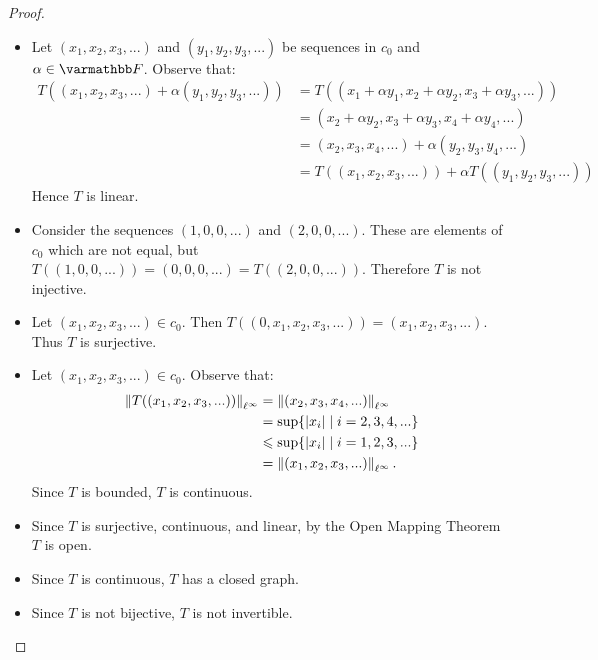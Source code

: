 \documentclass[10pt,oneside,openany]{memoir}
\begin{document}
    \begin{proof}
        \phantom{a}
        \begin{itemize}[itemsep=1pt,topsep=3pt]
            \item  Let $(x_1,x_2,x_3,...)$ and $(y_1,y_2,y_3,...)$ be sequences in $c_0$ and $\alpha \in \bfF$. Observe that:
            \begin{equation*}
            \begin{split}
                T((x_1,x_2,x_3,...) + \alpha (y_1,y_2,y_3,...))
                & = T((x_1 + \alpha y_1, x_2 + \alpha y_2, x_3 + \alpha y_3,...)) \\
                & = (x_2 + \alpha y_2, x_3 + \alpha y_3, x_4 + \alpha y_4,...) \\
                & = (x_2,x_3,x_4,...) + \alpha (y_2,y_3,y_4,...) \\
                & = T((x_1,x_2,x_3,...)) + \alpha T((y_1,y_2,y_3,...))
            \end{split}
            \end{equation*}
        Hence $T$ is linear.

        \item Consider the sequences $(1,0,0,...)$ and $(2,0,0,...)$. These are elements of $c_0$ which are not equal, but $T((1,0,0,...)) = (0,0,0,...) = T((2,0,0,...))$. Therefore $T$ is not injective.
        
        \item Let $(x_1,x_2,x_3,...) \in c_0$. Then $T((0,x_1,x_2,x_3,...)) = (x_1,x_2,x_3,...)$. Thus $T$ is surjective.
        
        \item Let $(x_1,x_2,x_3,...) \in c_0$. Observe that:
            \begin{equation*}
            \begin{split}
                \left\lVert T((x_1,x_2,x_3,...)) \right\rVert_{\ell^\infty} 
                & = \left\lVert (x_2,x_3,x_4,...) \right\rVert_{\ell^\infty} \\
                & = \sup \{|x_i| \mid i = 2,3,4,...\} \\
                & \leqslant \sup \{|x_i| \mid i = 1,2,3,...\} \\
                & = \left\lVert (x_1,x_2,x_3,...) \right\rVert_{\ell^\infty}.
            \end{split}
            \end{equation*}
        Since $T$ is bounded, $T$ is continuous.

        \item Since $T$ is surjective, continuous, and linear, by the Open Mapping Theorem $T$ is open.
        
        \item Since $T$ is continuous, $T$ has a closed graph.
        
        \item Since $T$ is not bijective, $T$ is not invertible.
        \end{itemize}
    \end{proof}
\end{document}
